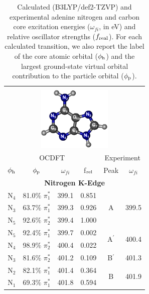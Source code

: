 \documentclass[12pt]{article}
\begin{document}
 \begin{table}[!ht]
 \footnotesize
\caption{Calculated (B3LYP/def2-TZVP) and experimental adenine nitrogen and carbon core excitation energies ($\omega_{fi}$, in eV) and relative oscillator strengths ($f_{\rm real}$).  For each calculated transition, we also report the label of the core atomic orbital ($\phi_{\rm h}$) and the  largest ground-state virtual orbital contribution to the particle orbital ($\phi_{\rm p}$).
}
 \centering
     \begin{tabular*}{8.5cm}{@{\extracolsep{\fill} }cccccc}
     \hline\hline\\[-8pt]
     \multicolumn{6}{c}{
 \includegraphics[width=3.5cm]{AdenineNumbering.png}}\\
     \hline
   \multicolumn{4}{c}{OCDFT} &\multicolumn{2}{c}{Experiment} \\
 $\phi_{\rm h}$ &  $\phi_{\rm p}$ & $\omega_{fi}$ & f$_{\rm rel}$ & Peak &  $\omega_{fi}$   \\[1pt]
   \hline
    \multicolumn{6}{c}{\textbf{Nitrogen K-Edge}} \vspace{0.05in}\\
    N$_4$
 &   81.0$\%$ $\pi_1^*$  & 399.1 & 0.851 & \multirow{3}{*}{A} & \multirow{3}{*}{399.5} \\
    N$_3$
 &   63.7$\%$ $\pi_1^*$  & 399.3 & 0.926 \\
    N$_5$
 &   92.6$\%$ $\pi_2^*$  & 399.4 & 1.000 
\vspace{0.05in}\\
    N$_5$
 &   92.4$\%$ $\pi_1^*$  & 399.7 & 0.002 & \multirow{2}{*}{A$^{\prime}$} & \multirow{2}{*}{400.4}  \\ %
    N$_4$
 &   98.9$\%$ $\pi_2^*$
 & 400.4 & 0.022 
 \vspace{0.05in}\\
    N$_3$
 &   81.6$\%$ $\pi_2^*$  & 401.2 & 0.109 & B$^{\prime}$ & 401.3 
 \vspace{0.05in}\\
    N$_2$
 &   82.1$\%$ $\pi_1^*$  & 401.4 & 0.364 & \multirow{3}{*}{B} & \multirow{3}{*}{401.9}\\
    N$_1$
 &   69.3$\%$ $\pi_1^*$  & 401.8 & 0.594 \\

\end{tabular*}
\end{table}
\end{document}

